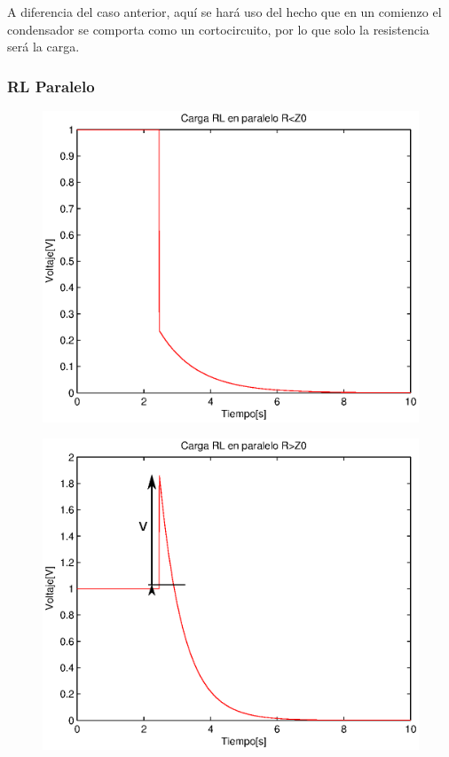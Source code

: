 \documentclass[11pt,onecolumn]{article}
\begin{document}
A diferencia del caso anterior, aquí se hará uso del hecho que en un comienzo el condensador se comporta como un cortocircuito, por lo que solo la resistencia será la carga.

\subsubsection{RL Paralelo}

\begin{figure}[H]
\centering
\includegraphics[scale=0.6]{img/RL_paralelo_rme0.eps}
\label{}
\end{figure}

\begin{figure}[H]
\centering
\includegraphics[scale=0.6]{img/RL_paralelo_rma0.eps}
\label{}
\end{figure}
\end{document}
